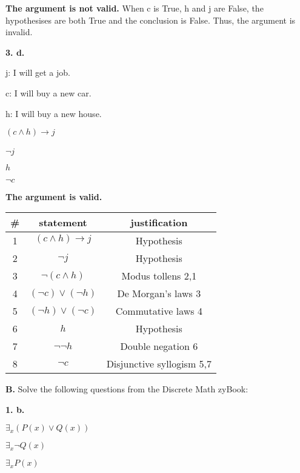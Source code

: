 \documentclass[11pt]{article}
\begin{document}
    \textbf{The argument is not valid.}
    When c is True, h and j are False, the hypothesises are both True and the conclusion is False. Thus, the argument is invalid. 
	
	\vspace{4mm}
	\textbf{3. d.}
	
	j: I will get a job.
	
	c: I will buy a new car.
	
	h: I will buy a new house.
	
	\begin{center}
	$(c\wedge h)\xrightarrow[]{}j$
	
	$\neg j$
	
	$h$
	
	$\neg c$
	\end{center}
	
	\textbf{The argument is valid.}
	\begin{center}
    \begin{tabular}{||c c c||} 
    \hline
    \# & statement & justification \\ [0.5ex] 
    \hline\hline
    1 & $(c\wedge h)\xrightarrow[]{}j$ & Hypothesis \\ 
    \hline
    2 & $\neg j$ & Hypothesis \\
    \hline
    3 & $\neg (c\wedge h)$ & Modus tollens 2,1 \\
    \hline
    4 & $(\neg c)\vee (\neg h)$ & De Morgan's laws 3 \\
    \hline
    5 & $(\neg h)\vee (\neg c)$ & Commutative laws 4 \\
    \hline
    6 & $h$ & Hypothesis \\
    \hline
    7 & $\neg \neg h$ & Double negation 6 \\
    \hline
    8 & $\neg c$ & Disjunctive syllogism 5,7 \\
    \hline
    \end{tabular}
    \end{center}
	

	\vspace{4mm}
	\textbf{B.} Solve the following questions from the Discrete Math zyBook:
	\medskip
	
	\textbf{1. b.}
	
	\begin{center}
	$\exists_x (P(x)\vee Q(x))$
	
	$\exists_x \neg Q(x)$
	
	$\exists_x P(x)$

	\end{center}
	
\end{document}
